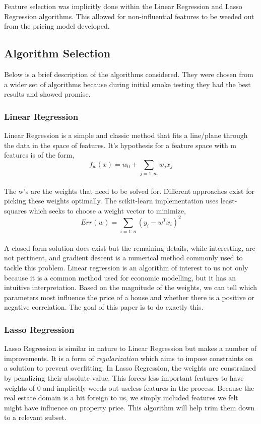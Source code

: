 \documentclass{acm_proc_article-sp}
\begin{document}
	Feature selection was implicitly done within the Linear Regression and Lasso Regression algorithms. This allowed for non-influential features to be weeded out from the pricing model developed.
	
\subsection{Algorithm Selection} %
	Below is a brief description of the algorithms considered. They were chosen from a wider set of algorithms because during initial smoke testing they had the best results and showed promise. 
	
\subsubsection{Linear Regression} %
	Linear Regression is a simple and classic method that fits a line/plane through the data in the space of features. It's hypothesis for a feature space with m features is of the form, \\
	\[  f_{w}(x) = w_{0}  + \sum_{j=1:m}w_{j}x_{j} \] \\

	The w's are the weights that need to be solved for. Different approaches exist for picking these weights optimally. The scikit-learn implementation uses least-squares which seeks to choose a weight vector to minimize,
	\[ Err(w)  = \sum_{i=1:n}(y_{i} - w^{T}x_{i})^{2}\] \\
	
	A closed form solution does exist but the remaining details, while interesting, are not pertinent, and gradient descent is a numerical method commonly used to tackle this problem. Linear regression is an algorithm of interest to us not only because it is a common method used for economic modelling, but it has an intuitive interpretation. Based on the magnitude of the weights, we can tell which parameters most influence the price of a house and whether there is a positive or negative correlation. The goal of this paper is to do exactly this.
	
\subsubsection{Lasso Regression} %
	Lasso Regression is similar in nature to Linear Regression but makes a number of improvements. It is a form of \emph{regularization} which aims to impose constraints on a solution to prevent overfitting. In Lasso Regression, the weights are constrained by penalizing their absolute value. This forces less important features to have weights of 0 and implicitly weeds out useless features in the process. Because the real estate domain is a bit foreign to us, we simply included features we felt might have influence on property price. This algorithm will help trim them down to a relevant subset.
	
\end{document}
